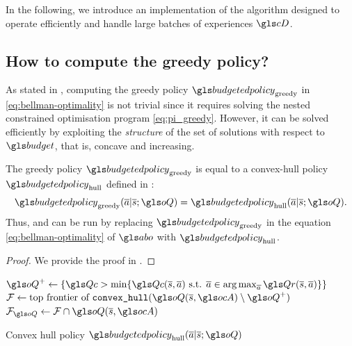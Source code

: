 


In the following, we introduce an implementation of the \BFTQ algorithm designed to operate efficiently and handle large batches of experiences $\cD$.

\subsection{How to compute the greedy policy?}
\label{subsec:compute-greedy-policy}
As stated in , computing the greedy policy $\budgetedpolicy_\text{greedy}$ in \eqref{eq:bellman-optimality} is not trivial since it requires solving the nested constrained optimisation program \eqref{eq:pi_greedy}.
However, it can be solved efficiently by exploiting the \emph{structure} of the set of solutions with respect to $\budget$, that is, concave and increasing.

\begin{proposition}
	\begin{leftbar}[propositionbar]
	\label{prop:bftq_pi_hull}
	The greedy policy $\budgetedpolicy_\text{greedy}$ is equal to a convex-hull policy $\budgetedpolicy_\text{hull}$ defined in :
    \begin{equation*}
        \budgetedpolicy_\text{greedy}(\oa|\os; \oQ) = \budgetedpolicy_\text{hull}(\oa|\os; \oQ).
    \end{equation*}
    Thus,  and  can be run by replacing $\budgetedpolicy_\text{greedy}$ in the equation \eqref{eq:bellman-optimality} of $\abo$ with $\budgetedpolicy_\text{hull}$.
    \end{leftbar}
\end{proposition}
\begin{proof}
	We provide the proof in .
\end{proof}

\begin{algorithm}[th]
	\DontPrintSemicolon
    $\oQ^+\leftarrow \{\Qc > \min \{\Qc(\os,\oa) \text{ s.t. }\oa\in\argmax_{\oa} \Qr(\os,\oa)\} \}$\;
    $\cF \leftarrow \text{top frontier of }\texttt{convex\_hull}(\oQ(\os,\ocA) \setminus \oQ^+)$\;
    $\cF_{\oQ} \leftarrow \cF\cap \oQ(\os,\ocA)$\;
    \caption{Convex hull policy $\budgetedpolicy_\text{hull}(\oa|\os; \oQ)$}
    \label{alg:pi_hull}
\end{algorithm}

